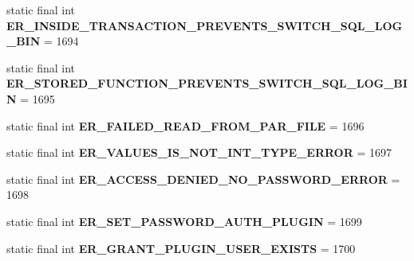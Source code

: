 \begin{DoxyCompactItemize}
static final int {\bfseries E\+R\+\_\+\+I\+N\+S\+I\+D\+E\+\_\+\+T\+R\+A\+N\+S\+A\+C\+T\+I\+O\+N\+\_\+\+P\+R\+E\+V\+E\+N\+T\+S\+\_\+\+S\+W\+I\+T\+C\+H\+\_\+\+S\+Q\+L\+\_\+\+L\+O\+G\+\_\+\+B\+IN} = 1694
\item 
\mbox{\label{classcom_1_1mysql_1_1cj_1_1exceptions_1_1_mysql_error_numbers_ac45d98ab7aa6a590bc9421bdd698fe1d}} 
static final int {\bfseries E\+R\+\_\+\+S\+T\+O\+R\+E\+D\+\_\+\+F\+U\+N\+C\+T\+I\+O\+N\+\_\+\+P\+R\+E\+V\+E\+N\+T\+S\+\_\+\+S\+W\+I\+T\+C\+H\+\_\+\+S\+Q\+L\+\_\+\+L\+O\+G\+\_\+\+B\+IN} = 1695
\item 
\mbox{\label{classcom_1_1mysql_1_1cj_1_1exceptions_1_1_mysql_error_numbers_adb67981c1a39a78cc1582fb3733f7923}} 
static final int {\bfseries E\+R\+\_\+\+F\+A\+I\+L\+E\+D\+\_\+\+R\+E\+A\+D\+\_\+\+F\+R\+O\+M\+\_\+\+P\+A\+R\+\_\+\+F\+I\+LE} = 1696
\item 
\mbox{\label{classcom_1_1mysql_1_1cj_1_1exceptions_1_1_mysql_error_numbers_ac428c467da84ab70547f029aadba24a7}} 
static final int {\bfseries E\+R\+\_\+\+V\+A\+L\+U\+E\+S\+\_\+\+I\+S\+\_\+\+N\+O\+T\+\_\+\+I\+N\+T\+\_\+\+T\+Y\+P\+E\+\_\+\+E\+R\+R\+OR} = 1697
\item 
\mbox{\label{classcom_1_1mysql_1_1cj_1_1exceptions_1_1_mysql_error_numbers_a8c0e9e284094b0ee15e773479cce2b95}} 
static final int {\bfseries E\+R\+\_\+\+A\+C\+C\+E\+S\+S\+\_\+\+D\+E\+N\+I\+E\+D\+\_\+\+N\+O\+\_\+\+P\+A\+S\+S\+W\+O\+R\+D\+\_\+\+E\+R\+R\+OR} = 1698
\item 
\mbox{\label{classcom_1_1mysql_1_1cj_1_1exceptions_1_1_mysql_error_numbers_ae7a0e630b170e9bb449b71b92f468076}} 
static final int {\bfseries E\+R\+\_\+\+S\+E\+T\+\_\+\+P\+A\+S\+S\+W\+O\+R\+D\+\_\+\+A\+U\+T\+H\+\_\+\+P\+L\+U\+G\+IN} = 1699
\item 
\mbox{\label{classcom_1_1mysql_1_1cj_1_1exceptions_1_1_mysql_error_numbers_a7352e88ca60a563aa04e01885bdff89b}} 
static final int {\bfseries E\+R\+\_\+\+G\+R\+A\+N\+T\+\_\+\+P\+L\+U\+G\+I\+N\+\_\+\+U\+S\+E\+R\+\_\+\+E\+X\+I\+S\+TS} = 1700

\end{DoxyCompactItemize}
